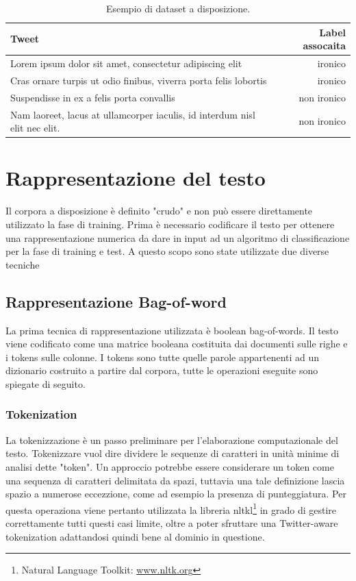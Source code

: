 \documentclass[oneside]{book}
\begin{document}
\begin{table}[h!]
	\centering
	\begin{tabular}[t]{lr}
		\hline
		\textbf{Tweet} & \textbf{Label assocaita}\\
		\hline
		Lorem ipsum dolor sit amet, consectetur adipiscing elit & ironico     \\
		Cras ornare turpis ut odio finibus, viverra porta felis lobortis & ironico \\
		Suspendisse in ex a felis porta convallis & non ironico \\
		Nam laoreet, lacus at ullamcorper iaculis, id interdum nisl elit nec elit. & non ironico \\
		
		\hline
	\end{tabular}
	\caption{Esempio di dataset a disposizione.}
\end{table}%




\section{Rappresentazione del testo}
Il corpora a disposizione è definito "crudo" e non può essere direttamente utilizzato la fase di training. Prima è necessario codificare il testo per ottenere una rappresentazione numerica da dare in input ad un algoritmo di classificazione per la fase di training e test. A questo scopo sono state utilizzate due diverse tecniche

\subsection{Rappresentazione Bag-of-word}
La prima tecnica di rappresentazione utilizzata è boolean bag-of-words.
Il testo viene codificato come una matrice booleana costituita dai documenti sulle righe e i tokens sulle colonne. I tokens sono tutte quelle parole appartenenti ad un dizionario costruito a partire dal corpora, tutte le operazioni eseguite sono spiegate di seguito.

\subsubsection{Tokenization}
La tokenizzazione è un passo preliminare per l'elaborazione computazionale del testo. Tokenizzare vuol dire dividere le sequenze di caratteri in unità minime di analisi dette "token". Un approccio potrebbe essere considerare un token come una sequenza di caratteri delimitata da spazi, tuttavia una tale definizione lascia spazio a numerose eccezzione, come ad esempio la presenza di punteggiatura. Per questa operaziona viene pertanto utilizzata la libreria
nltkl\footnote{Natural Language Toolkit: \url{www.nltk.org}} in grado di gestire correttamente tutti questi casi limite, oltre a poter sfruttare una Twitter-aware tokenization adattandosi quindi bene al dominio in questione.
\end{document}
